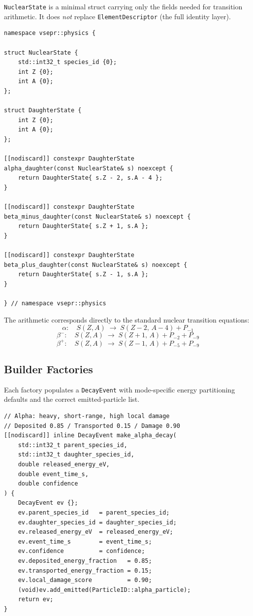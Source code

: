 \documentclass[11pt,a4paper]{article}
\begin{document}
\texttt{NuclearState} is a minimal struct carrying only the fields
needed for transition arithmetic.  It does \emph{not} replace
\texttt{ElementDescriptor} (the full identity layer).

\begin{lstlisting}[style=cpp20, caption={Transition structs and constexpr daughter arithmetic}]
namespace vsepr::physics {

struct NuclearState {
    std::int32_t species_id {0};
    int Z {0};
    int A {0};
};

struct DaughterState {
    int Z {0};
    int A {0};
};

[[nodiscard]] constexpr DaughterState
alpha_daughter(const NuclearState& s) noexcept {
    return DaughterState{ s.Z - 2, s.A - 4 };
}

[[nodiscard]] constexpr DaughterState
beta_minus_daughter(const NuclearState& s) noexcept {
    return DaughterState{ s.Z + 1, s.A };
}

[[nodiscard]] constexpr DaughterState
beta_plus_daughter(const NuclearState& s) noexcept {
    return DaughterState{ s.Z - 1, s.A };
}

} // namespace vsepr::physics
\end{lstlisting}

The arithmetic corresponds directly to the standard nuclear transition
equations:
\[
\alpha:\quad S(Z,A) \;\to\; S(Z-2,\,A-4) + P_{-1}
\]
\[
\beta^-:\quad S(Z,A) \;\to\; S(Z+1,\,A) + P_{-2} + P_{-9}
\]
\[
\beta^+:\quad S(Z,A) \;\to\; S(Z-1,\,A) + P_{-5} + P_{-9}
\]

\subsection{Builder Factories}

Each factory populates a \texttt{DecayEvent} with mode-specific energy
partitioning defaults and the correct emitted-particle list.

\begin{lstlisting}[style=cpp20, caption={Alpha decay factory}]
// Alpha: heavy, short-range, high local damage
// Deposited 0.85 / Transported 0.15 / Damage 0.90
[[nodiscard]] inline DecayEvent make_alpha_decay(
    std::int32_t parent_species_id,
    std::int32_t daughter_species_id,
    double released_energy_eV,
    double event_time_s,
    double confidence
) {
    DecayEvent ev {};
    ev.parent_species_id   = parent_species_id;
    ev.daughter_species_id = daughter_species_id;
    ev.released_energy_eV  = released_energy_eV;
    ev.event_time_s        = event_time_s;
    ev.confidence          = confidence;
    ev.deposited_energy_fraction   = 0.85;
    ev.transported_energy_fraction = 0.15;
    ev.local_damage_score          = 0.90;
    (void)ev.add_emitted(ParticleID::alpha_particle);
    return ev;
}
\end{lstlisting}
\end{document}
